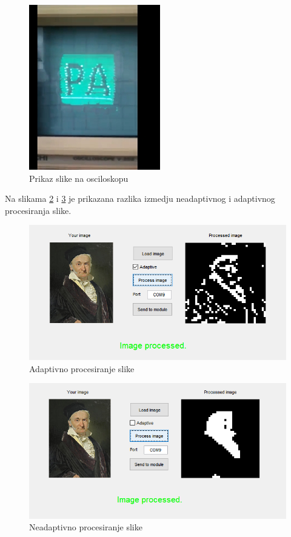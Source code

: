 \documentclass[12pt]{article}
\begin{document}
\begin{figure}[h!]
    \centering
  \includegraphics[scale=0.70]{PAfinal.jpg}
  \caption{Prikaz slike na osciloskopu}
  \label{fig:pa}
\end{figure}
\newline
Na slikama \ref{fig:adap} i \ref{fig:glp} je prikazana razlika izmedju neadaptivnog i adaptivnog procesiranja slike.
\begin{figure}[h!]
    \centering
  \includegraphics[scale=0.65]{50853112_240538963524513_8617086812604596224_n.png}
  \caption{Adaptivno procesiranje slike}
  \label{fig:adap}
\end{figure}
\begin{figure}[h!]
    \centering
  \includegraphics[scale=0.65]{51223868_2219858701618201_6484712911091531776_n.png}
  \caption{Neadaptivno procesiranje slike}
  \label{fig:glp}
\end{figure}
\pagebreak
\end{document}
